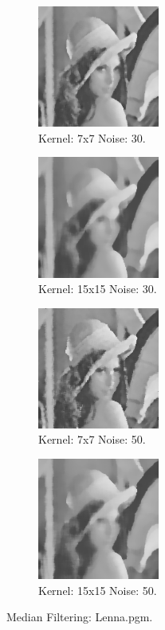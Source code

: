 \documentclass[letterpaper,10pt]{article}
\begin{document}
 \begin{figure}[hbtp]
    \centering
    \begin{subfigure}{4cm}
      \includegraphics[width=4cm]{images/median_lenna_7.png}
      \caption{Kernel: 7x7 Noise: 30.}
    \end{subfigure}
    \begin{subfigure}{4cm}
      \includegraphics[width=4cm]{images/median_lenna_15.png}
      \caption{Kernel: 15x15 Noise: 30.}
    \end{subfigure}
    \begin{subfigure}{4cm}
      \includegraphics[width=4cm]{images/median_lenna_7_50.png}
      \caption{Kernel: 7x7 Noise: 50.}
    \end{subfigure}
    \begin{subfigure}{4cm}
      \includegraphics[width=4cm]{images/median_lenna_15_50.png}
      \caption{Kernel: 15x15 Noise: 50.}
    \end{subfigure}
    \caption{Median Filtering: Lenna.pgm.}
    \label{fig:medianlenna}
  \end{figure}
\end{document}
